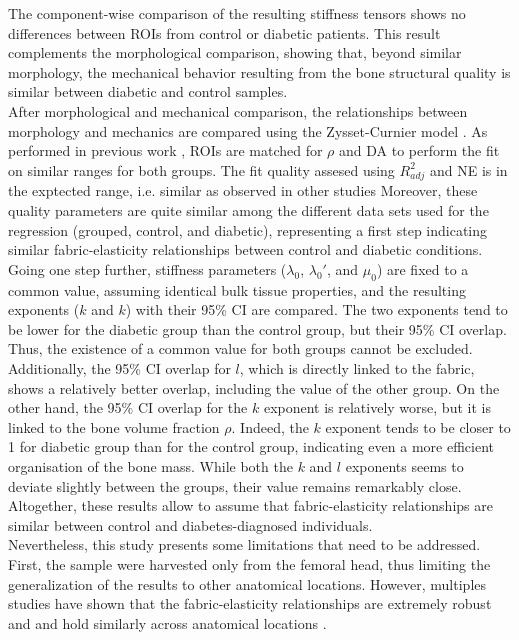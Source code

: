 \documentclass[a4paper,fleqn]{DC_ArtStyle}
\begin{document}
	The component-wise comparison of the resulting stiffness tensors shows no differences between ROIs from control or diabetic patients.
	This result complements the morphological comparison, showing that, beyond similar morphology, the mechanical behavior resulting from the bone structural quality is similar between diabetic and control samples.
	\\[0.5em]
	After morphological and mechanical comparison, the relationships between morphology and mechanics are compared using the Zysset-Curnier model \cite{Zysset1995}.
	As performed in previous work \cite{Simon2022}, ROIs are matched for $\rho$ and DA to perform the fit on similar ranges for both groups.
	The fit quality assesed using $R_{adj}^{2}$ and NE is in the exptected range, i.e. similar as observed in other studies \cite{Gross2012, Panyasantisuk2015, Simon2022}
	Moreover, these quality parameters are quite similar among the different data sets used for the regression (grouped, control, and diabetic), representing a first step indicating similar fabric-elasticity relationships between control and diabetic conditions.
	Going one step further, stiffness parameters ($\lambda_0$, $\lambda_0'$, and $\mu_0$) are fixed to a common value, assuming identical bulk tissue properties, and the resulting exponents ($k$ and $k$) with their 95\% CI are compared.
	The two exponents tend to be lower for the diabetic group than the control group, but their 95\% CI overlap.
	Thus, the existence of a common value for both groups cannot be excluded.
	Additionally, the 95\% CI overlap for $l$, which is directly linked to the fabric, shows a relatively better overlap, including the value of the other group.
	On the other hand, the 95\% CI overlap for the $k$ exponent is relatively worse, but it is linked to the bone volume fraction $\rho$.
	Indeed, the $k$ exponent tends to be closer to 1 for diabetic group than for the control group, indicating even a more efficient organisation of the bone mass.
	While both the $k$ and $l$ exponents seems to deviate slightly between the groups, their value remains remarkably close.
	Altogether, these results allow to assume that fabric-elasticity relationships are similar between control and diabetes-diagnosed individuals.
	\\[0.5em]
	Nevertheless, this study presents some limitations that need to be addressed.
	First, the sample were harvested only from the femoral head, thus limiting the generalization of the results to other anatomical locations.
	However, multiples studies have shown that the fabric-elasticity relationships are extremely robust and and hold similarly across anatomical locations \cite{Gross2012,Panyasantisuk2015,Simon2022}.
\end{document}
